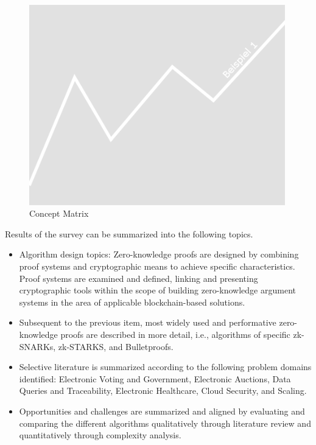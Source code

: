 \begin{figure}[hbt]
	\centering
		\includegraphics[width=0.99\textwidth]{Pictures/bsp1.png}
	\caption{Concept Matrix}
	\label{fig:concept_matrix}
\end{figure}

Results of the survey can be summarized into the following topics. 
\begin{itemize}
    \item Algorithm design topics: Zero-knowledge proofs are designed by combining proof systems and cryptographic means to achieve specific characteristics. Proof systems are examined and defined, linking and presenting cryptographic tools within the scope of building zero-knowledge argument systems in the area of applicable blockchain-based solutions.
    \item Subsequent to the previous item, most widely used and performative zero-knowledge proofs are described in more detail, i.e., algorithms of specific zk-SNARKs, zk-STARKS, and Bulletproofs.
    \item Selective literature is summarized according to the following problem domains identified: Electronic Voting and Government, Electronic Auctions, Data Queries and Traceability, Electronic Healthcare, Cloud Security, and Scaling.
    \item Opportunities and challenges are summarized and aligned by evaluating and comparing the different algorithms qualitatively through literature review and quantitatively through complexity analysis.
\end{itemize}

